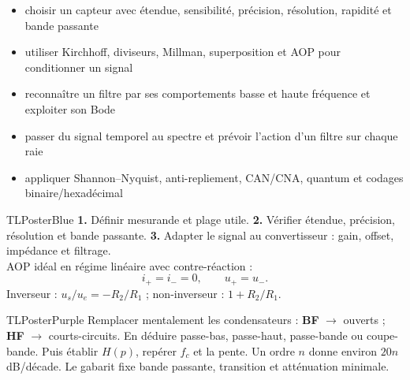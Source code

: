 \documentclass[10pt,a3paper]{article}
\begin{document}
\vspace{2mm}
\begin{minipage}[t]{0.60\linewidth}
\begin{TLPosterSavoirs}
\begin{itemize}
  \item choisir un capteur avec étendue, sensibilité, précision, résolution, rapidité et bande passante
  \item utiliser Kirchhoff, diviseurs, Millman, superposition et AOP pour conditionner un signal
  \item reconnaître un filtre par ses comportements basse et haute fréquence et exploiter son Bode
  \item passer du signal temporel au spectre et prévoir l'action d'un filtre sur chaque raie
  \item appliquer Shannon--Nyquist, anti-repliement, CAN/CNA, quantum et codages binaire/hexadécimal
\end{itemize}
\end{TLPosterSavoirs}
\end{minipage}\hfill
\begin{minipage}[t]{0.37\linewidth}
\end{minipage}
\vfill
\begin{minipage}[t]{0.49\linewidth}
\begin{TLPosterBloc}{TLPosterBlue}
\textbf{1.} Définir mesurande et plage utile. \textbf{2.} Vérifier étendue, précision, résolution et bande passante. \textbf{3.} Adapter le signal au convertisseur : gain, offset, impédance et filtrage.\\[1mm]
AOP idéal en régime linéaire avec contre-réaction :
\[
i_+=i_-=0,\qquad u_+=u_-.
\]
Inverseur : $u_s/u_e=-R_2/R_1$ ; non-inverseur : $1+R_2/R_1$.
\end{TLPosterBloc}
\begin{TLPosterBloc}{TLPosterPurple}
Remplacer mentalement les condensateurs : \textbf{BF} $\rightarrow$ ouverts ; \textbf{HF} $\rightarrow$ courts-circuits. En déduire passe-bas, passe-haut, passe-bande ou coupe-bande. Puis établir $H(p)$, repérer $f_c$ et la pente. Un ordre $n$ donne environ $20n$ dB/décade. Le gabarit fixe bande passante, transition et atténuation minimale.
\end{TLPosterBloc}
\end{minipage}\hfill
\end{document}
